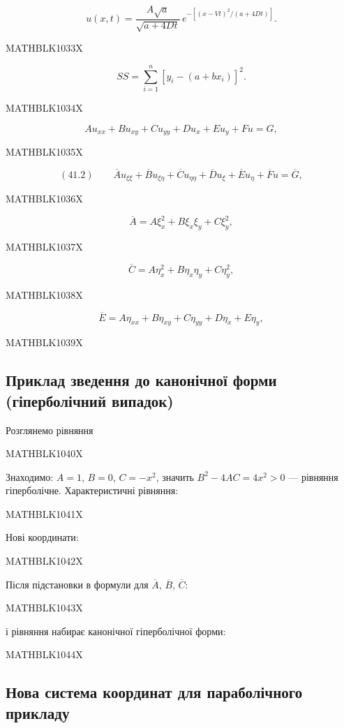 \documentclass[
  ukrainian,
]{article}
\begin{document}
\[
u(x, t) = \frac{A\sqrt{a}}{\sqrt{a+4Dt}}\, e^{-[(x-Vt)^{2}/(a+4Dt)]}.
\]

MATHBLK1033X

\[
SS = \sum_{i=1}^{n} [y_i - (a + bx_i)]^2.
\]

MATHBLK1034X

\[
A u_{xx} + B u_{xy} + C u_{yy} + D u_x + E u_y + F u = G,
\]

MATHBLK1035X

\[
(41.2)\qquad\overline{A} u_{\xi\xi} + \overline{B} u_{\xi\eta} + \overline{C} u_{\eta\eta} + \overline{D} u_{\xi} + \overline{E} u_{\eta} + \overline{F} u = \overline{G},
\]

MATHBLK1036X

\[
\overline{A} = A\xi_x^2 + B\xi_x\xi_y + C\xi_y^2,
\]

MATHBLK1037X

\[
\overline{C} = A\eta_x^2 + B\eta_x\eta_y + C\eta_y^2,
\]

MATHBLK1038X

\[
\overline{E} = A\eta_{xx} + B\eta_{xy} + C\eta_{yy} + D\eta_x + E\eta_y,
\]

MATHBLK1039X

\subsection{Приклад зведення до канонічної форми (гіперболічний
випадок)}\label{ux43fux440ux438ux43aux43bux430ux434-ux437ux432ux435ux434ux435ux43dux43dux44f-ux434ux43e-ux43aux430ux43dux43eux43dux456ux447ux43dux43eux457-ux444ux43eux440ux43cux438-ux433ux456ux43fux435ux440ux431ux43eux43bux456ux447ux43dux438ux439-ux432ux438ux43fux430ux434ux43eux43a}

Розглянемо рівняння

MATHBLK1040X

Знаходимо: \(A = 1\), \(B = 0\), \(C = -x^2\), значить
\(B^2 - 4AC = 4x^2 > 0\) --- рівняння гіперболічне. Характеристичні
рівняння:

MATHBLK1041X

Нові координати:

MATHBLK1042X

Після підстановки в формули для \(\overline{A}\), \(\overline{B}\),
\(\overline{C}\):

MATHBLK1043X

і рівняння набирає канонічної гіперболічної форми:

MATHBLK1044X

\subsection{Нова система координат для параболічного
прикладу}\label{ux43dux43eux432ux430-ux441ux438ux441ux442ux435ux43cux430-ux43aux43eux43eux440ux434ux438ux43dux430ux442-ux434ux43bux44f-ux43fux430ux440ux430ux431ux43eux43bux456ux447ux43dux43eux433ux43e-ux43fux440ux438ux43aux43bux430ux434ux443}
\end{document}
